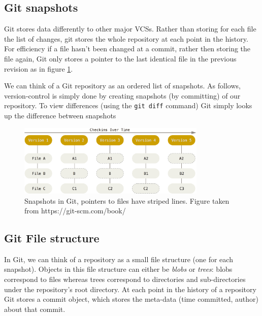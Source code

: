 \documentclass[12pt,twoside,notitlepage]{report}
\begin{document}
\subsection{Git snapshots}

Git stores data differently to other major VCSs. Rather than storing for each file the list of changes, git stores the whole repository at each  point in the history. For efficiency if a file hasn't been changed at a commit, rather then storing the file again, Git only stores a pointer to the last identical file in the previous revision as in figure \ref{snapshot_git}.

We can think of a Git repository as an ordered list of snapshots. As follows, version-control is simply done by creating snapshots (by committing) of our repository. To view differences (using the \texttt{git diff} command) Git simply looks up the difference between snapshots
\begin{figure}[h]
\includegraphics[width=0.8\textwidth]{snapshots_git.png}
\centering
\captionsetup{width=0.8\textwidth}

\caption[Snapshots in Git]{Snapshots in Git, pointers to files have striped lines. Figure taken from https://git-scm.com/book/}
\label{snapshot_git}
\end{figure}
\subsection{Git File structure}
In Git, we can think of a repository as a small file structure (one for each snapshot). Objects in this file structure can either be \textit{blobs} or \textit{trees}: blobs correspond to files whereas trees correspond to directories and sub-directories under the repository's root directory. At each point in the history of a repository Git stores a commit object, which stores the meta-data (time committed, author) about that commit.
\end{document}
